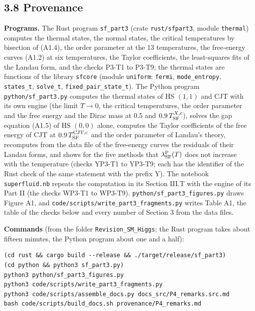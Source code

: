 \documentclass[
  10pt,
]{article}
\begin{document}
\hypertarget{provenance-1}{%
\subsection{3.8 Provenance}\label{provenance-1}}

\textbf{Programs.} The Rust program \texttt{sf\_part3} (crate
\texttt{rust/sfpart3}, module \texttt{thermal}) computes the thermal
states, the normal states, the critical temperatures by bisection of
(A1.4), the order parameter at the 13 temperatures, the free-energy
curves (A1.2) at six temperatures, the Taylor coefficients, the
least-squares fits of the Landau form, and the checks P3-T1 to P3-T9;
the thermal states are functions of the library \texttt{sfcore} (module
\texttt{uniform}: \texttt{fermi}, \texttt{mode\_entropy},
\texttt{states\_t}, \texttt{solve\_t}, \texttt{fixed\_pair\_state\_t}).
The Python program \texttt{python/sf\_part3.py} computes the thermal
states of HS \((1,1)\) and CJT with its own engine (the limit \(T\to0\),
the critical temperatures, the order parameter and the free energy and
the Dirac mass at \(0.5\) and \(0.9\,T^{X,{\rm c}}_{\rm SF}\)), solves
the gap equation (A1.5) of HS \((0,0)\) alone, computes the Taylor
coefficients of the free energy of CJT at
\(0.9\,T^{\rm CJT,c}_{\rm SF}\) and the order parameter of Landau's
theory, recomputes from the data file of the free-energy curves the
residuals of their Landau forms, and shows for the five methods that
\(\lambda^{\rm P}_{\rm SF}(T)\) does not increase with the temperature
(checks YP3-T1 to YP3-T9; each has the identifier of the Rust check of
the same statement with the prefix Y). The notebook
\texttt{superfluid.nb} repeats the computation in its Section III.T with
the engine of its Part II (the checks WP3-T1 to WP3-T9).
\texttt{python/sf\_part3\_figures.py} draws Figure A1, and
\texttt{code/scripts/write\_part3\_fragments.py} writes Table A1, the
table of the checks below and every number of Section 3 from the data
files.

\textbf{Commands} (from the folder \texttt{Revision\_SM\_Higgs}; the
Rust program takes about fifteen minutes, the Python program about one
and a half):

\begin{verbatim}
(cd rust && cargo build --release && ./target/release/sf_part3)
(cd python && python3 sf_part3.py)
python3 python/sf_part3_figures.py
python3 code/scripts/write_part3_fragments.py
python3 code/scripts/assemble_docs.py docs_src/P4_remarks.src.md
bash code/scripts/build_docs.sh provenance/P4_remarks.md
\end{verbatim}
\end{document}

